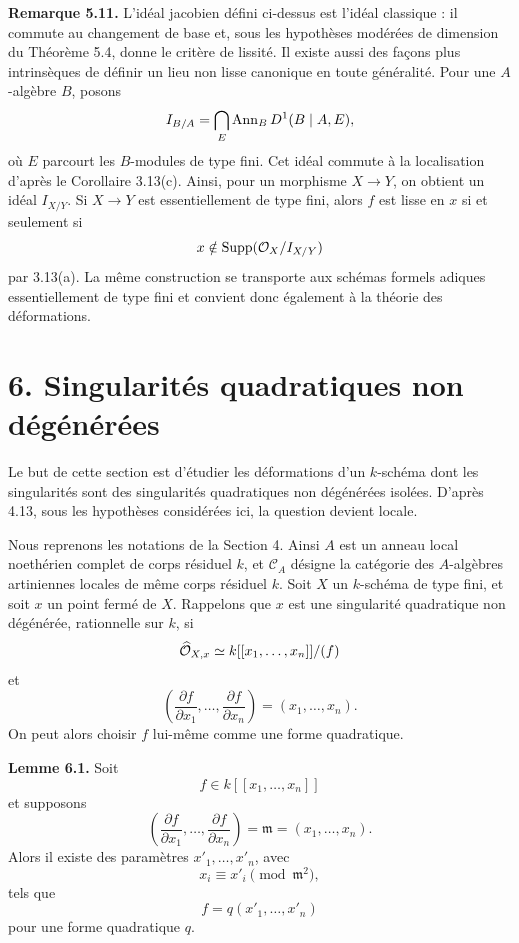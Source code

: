 \documentclass[11pt]{article}
\begin{document}
\textbf{Remarque 5.11.}  L'idéal jacobien défini ci-dessus est l'idéal classique : il commute au changement de base et, sous les hypothèses modérées de dimension du Théorème 5.4, donne le critère de lissité.  Il existe aussi des façons plus intrinsèques de définir un lieu non lisse canonique en toute généralité.  Pour une \(A\)-algèbre \(B\), posons
\[
        I_{B/A}
        =
        \bigcap_E
        \operatorname{Ann}_B D^1(B\mid A,E),
\]
où \(E\) parcourt les \(B\)-modules de type fini.  Cet idéal commute à la localisation d'après le Corollaire 3.13(c).  Ainsi, pour un morphisme \(X\to Y\), on obtient un idéal \(I_{X/Y}\).  Si \(X\to Y\) est essentiellement de type fini, alors \(f\) est lisse en \(x\) si et seulement si
\[
        x\notin \operatorname{Supp}(\mathcal O_X/I_{X/Y})
\]
par 3.13(a).  La même construction se transporte aux schémas formels adiques essentiellement de type fini et convient donc également à la théorie des déformations.

\section*{6. Singularités quadratiques non dégénérées}

Le but de cette section est d'étudier les déformations d'un \(k\)-schéma dont les singularités sont des singularités quadratiques non dégénérées isolées.  D'après 4.13, sous les hypothèses considérées ici, la question devient locale.

Nous reprenons les notations de la Section 4.  Ainsi \(A\) est un anneau local noethérien complet de corps résiduel \(k\), et \(\mathcal C_A\) désigne la catégorie des \(A\)-algèbres artiniennes locales de même corps résiduel \(k\).  Soit \(X\) un \(k\)-schéma de type fini, et soit \(x\) un point fermé de \(X\).  Rappelons que \(x\) est une singularité quadratique non dégénérée, rationnelle sur \(k\), si
\[
        \widehat{\mathcal O}_{X,x}
        \simeq
        k[[x_1,\ldots,x_n]]/(f)
\]
et
\[
        \left(\frac{\partial f}{\partial x_1},\ldots,
        \frac{\partial f}{\partial x_n}\right)=(x_1,\ldots,x_n).
\]
On peut alors choisir \(f\) lui-même comme une forme quadratique.

\textbf{Lemme 6.1.}  Soit
\[
        f\in k[[x_1,\ldots,x_n]]
\]
et supposons
\[
        \left(\frac{\partial f}{\partial x_1},\ldots,
        \frac{\partial f}{\partial x_n}\right)=\mathfrak m=(x_1,\ldots,x_n).
\]
Alors il existe des paramètres \(x'_1,\ldots,x'_n\), avec
\[
        x_i\equiv x'_i\pmod{\mathfrak m^2},
\]
tels que
\[
        f=q(x'_1,\ldots,x'_n)
\]
pour une forme quadratique \(q\).
\end{document}
